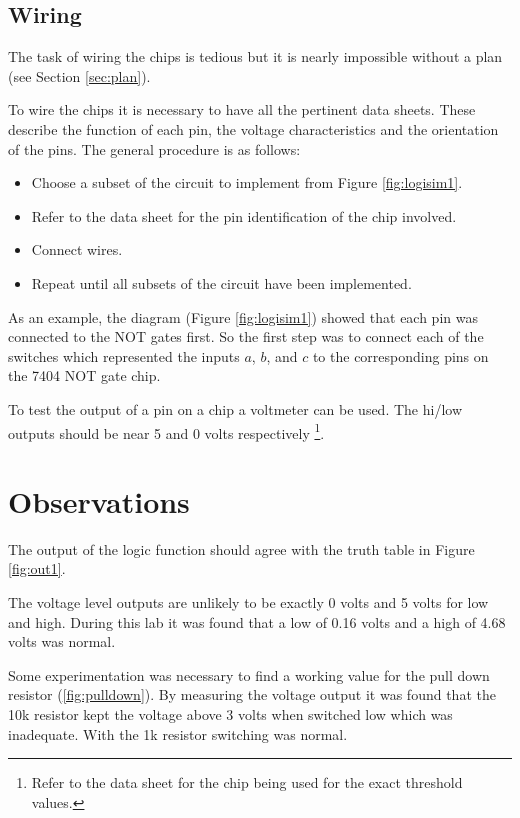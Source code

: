 \documentclass[12pt]{article}
\begin{document}
\subsection{Wiring}

The task of wiring the chips is tedious but it is nearly impossible
without a plan (see Section \ref{sec:plan}).

To wire the chips it is necessary to have all the pertinent data sheets.
These describe the function of each pin, the voltage characteristics and
the orientation of the pins.
The general procedure is as follows:
\begin{itemize}
	\item Choose a subset of the circuit to implement from Figure \ref{fig:logisim1}.
	\item Refer to the data sheet for the pin identification of the chip involved.
	\item Connect wires.
	\item Repeat until all subsets of the circuit have been implemented.
\end{itemize}

As an example, the diagram (Figure \ref{fig:logisim1}) showed that
each pin was connected to the NOT gates first.
So the first step was to connect each of the switches which represented
the inputs $a$, $b$, and $c$ to the corresponding pins on the 7404 NOT gate chip.

To test the output of a pin on a chip a voltmeter can be used.
The hi/low outputs should be near 5  and 0 volts respectively
\footnote{Refer to the data sheet for the chip being used for the exact
threshold values.}.


\section{Observations}

The output of the logic function should agree with the truth table
in Figure \ref{fig:out1}.

The voltage level outputs are unlikely to be exactly 0 volts and
5 volts for low and high.
During this lab it was found that a low
of 0.16 volts and a high of 4.68 volts was normal.

Some experimentation was necessary to find a working value for the
pull down resistor (\ref{fig:pulldown}).
By measuring the voltage output it was found that the 10k resistor
kept the voltage above 3 volts when switched low which was inadequate.
With the 1k resistor switching was normal.
\end{document}
